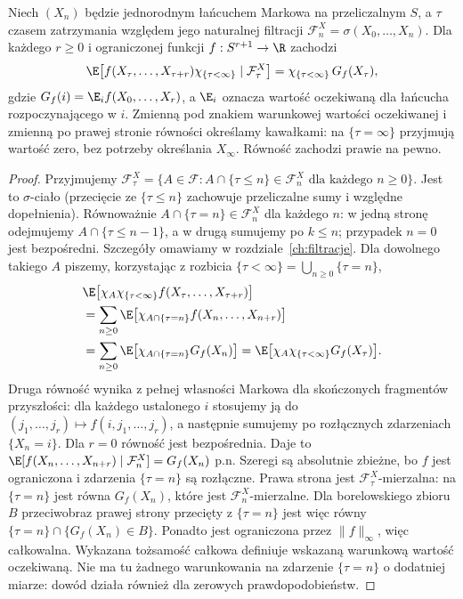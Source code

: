 \begin{twierdzenie}
\label{thm:rp1-12-strong-markov}
Niech $(X_n)$ będzie jednorodnym łańcuchem Markowa
na przeliczalnym $S$, a $\tau$ czasem zatrzymania
względem jego naturalnej filtracji
$\mathcal F_n^X=\sigma(X_0,\ldots,X_n)$.
Dla każdego $r\geq0$ i ograniczonej funkcji
$f:S^{r+1}\to\R$ zachodzi
\[
\E\bigl[f(X_\tau,\ldots,X_{\tau+r})
\chi_{\{\tau<\infty\}}\mid\mathcal F_\tau^X\bigr]
=\chi_{\{\tau<\infty\}}\,G_f(X_\tau),
\]
gdzie $G_f(i)=\E_i f(X_0,\ldots,X_r)$, a
$\E_i$ oznacza wartość oczekiwaną dla łańcucha
rozpoczynającego w $i$. Zmienną pod znakiem
warunkowej wartości oczekiwanej i zmienną po
prawej stronie równości określamy kawałkami:
na $\{\tau=\infty\}$
przyjmują wartość zero, bez potrzeby określania
$X_\infty$. Równość zachodzi prawie na pewno.
\end{twierdzenie}
\begin{proof}
Przyjmujemy
$\mathcal F_\tau^X=\{A\in\mathcal F:
A\cap\{\tau\leq n\}\in\mathcal F_n^X
\text{ dla każdego }n\geq0\}$.
Jest to $\sigma$-ciało (przecięcie ze
$\{\tau\leq n\}$ zachowuje przeliczalne sumy
i względne dopełnienia). Równoważnie
$A\cap\{\tau=n\}\in\mathcal F_n^X$ dla każdego $n$:
w jedną stronę odejmujemy
$A\cap\{\tau\leq n-1\}$, a w drugą sumujemy
po $k\leq n$; przypadek $n=0$ jest bezpośredni.
Szczegóły omawiamy w rozdziale~\ref{ch:filtracje}.
Dla dowolnego takiego $A$ piszemy, korzystając
z rozbicia $\{\tau<\infty\}=\bigcup_{n\geq0}\{\tau=n\}$,
\begin{align*}
&\E\bigl[\chi_{A}\chi_{\{\tau<\infty\}}
 f(X_\tau,\ldots,X_{\tau+r})\bigr]\\
&=\sum_{n\geq0}\E\bigl[
\chi_{A\cap\{\tau=n\}}f(X_n,\ldots,X_{n+r})\bigr]\\
&=\sum_{n\geq0}\E\bigl[
\chi_{A\cap\{\tau=n\}}G_f(X_n)\bigr]
=\E\bigl[\chi_{A}\chi_{\{\tau<\infty\}}G_f(X_\tau)\bigr].
\end{align*}
Druga równość wynika z pełnej własności Markowa
dla skończonych fragmentów przyszłości:
dla każdego ustalonego $i$ stosujemy ją do
$(j_1,\ldots,j_r)\mapsto f(i,j_1,\ldots,j_r)$,
a następnie sumujemy po rozłącznych zdarzeniach
$\{X_n=i\}$. Dla $r=0$ równość jest bezpośrednia.
Daje to
$\E[f(X_n,\ldots,X_{n+r})\mid\mathcal F_n^X]
=G_f(X_n)$ p.n.
Szeregi są absolutnie zbieżne, bo $f$ jest ograniczona
i zdarzenia $\{\tau=n\}$ są rozłączne.
Prawa strona jest $\mathcal F_\tau^X$-mierzalna:
na $\{\tau=n\}$ jest równa $G_f(X_n)$,
które jest $\mathcal F_n^X$-mierzalne.
Dla borelowskiego zbioru $B$ przeciwobraz prawej
strony przecięty z $\{\tau=n\}$ jest więc równy
$\{\tau=n\}\cap\{G_f(X_n)\in B\}$.
Ponadto jest ograniczona przez $\|f\|_\infty$,
więc całkowalna. Wykazana tożsamość całkowa
definiuje wskazaną warunkową wartość oczekiwaną. Nie ma tu żadnego warunkowania
na zdarzenie $\{\tau=n\}$ o dodatniej miarze:
dowód działa również dla zerowych prawdopodobieństw.
\end{proof}

